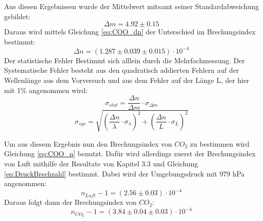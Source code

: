 \documentclass[12pt,a4paper]{article}
\begin{document}
Aus diesen Ergebnissen wurde der Mittelwert mitsamt seiner Standardabweichung gebildet:
\begin{equation}
\Delta m = 4.92 \pm 0.15
\end{equation}
Daraus wird mittels Gleichung \ref{eq:COO_dn} der Unterschied im Brechungsindex bestimmt:
\begin{equation}
\Delta n = (1.287 \pm 0.039 \pm 0.015)\cdot 10^{-4}
\end{equation}
Der statistische Fehler Bestimmt sich alllein durch die Mehrfachmessung.
Der Systematische Fehler besteht aus den quadratisch addierten Fehlern auf der Wellenlänge aus dem Vorversuch und aus dem Fehler auf der Länge L, der hier mit 1\% angenommen wird:
\begin{equation}
\sigma_{stat} = \dfrac{\Delta n}{\Delta m} \cdot \sigma_{\Delta m}
\end{equation}
\begin{equation}
\sigma_{sys} = \sqrt{\left(\dfrac{\Delta n}{\lambda} \cdot \sigma_{\lambda}\right)^2 + \left(\dfrac{\Delta n}{L} \cdot \sigma_{L}\right)^2}
\end{equation}

Um aus diesem Ergebnis nun den Brechungsindex von $CO_2$ zu bestimmen wird Gleichung \ref{eq:COO_n} benutzt. Dafür wird allerdings zuerst der Brechungsindex von Luft mithilfe der Resultate von Kapitel 3.3 und Gleichung \ref{eq:DruckBrechzahl} bestimmt. Dabei wird der Umgebungsdruck mit 979 hPa angenommen:
\begin{equation}
n_{Luft}-1 = (2.56 \pm 0.03)\cdot 10^{-4}
\end{equation}
Daraus folgt dann der Brechungsindex von $CO_2$:
\begin{equation}
n_{CO_2}-1 = (3.84 \pm 0.04 \pm 0.03)\cdot 10^{-4}
\end{equation}
\end{document}

